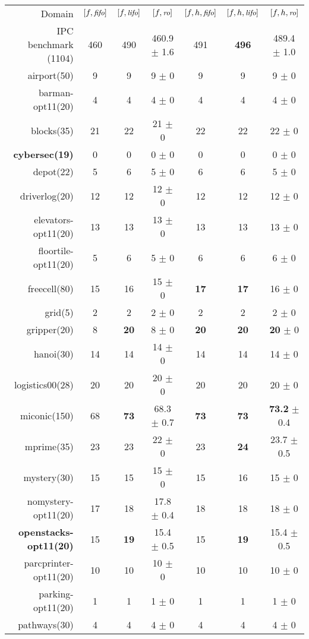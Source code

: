 \begin{center}
\begin{tabular}{|r|*{2}{ccc|}}
Domain & $[f,{\small\textit{fifo}}]$ & $[f,{\small\textit{lifo}}]$ & $[f,{\small\textit{ro}}]$ & $[f,h,{\small\textit{fifo}}]$ & $[f,h,{\small\textit{lifo}}]$ & $[f,h,{\small\textit{ro}}]$\\
IPC benchmark (1104) & 460 & 490 & 460.9 $\pm$ 1.6 & 491 & \textbf{496} & 489.4 $\pm$ 1.0\\
airport(50) & 9 & 9 & 9 $\pm$ 0 & 9 & 9 & 9 $\pm$ 0\\
barman-opt11(20) & 4 & 4 & 4 $\pm$ 0 & 4 & 4 & 4 $\pm$ 0\\
blocks(35) & 21 & 22 & 21 $\pm$ 0 & 22 & 22 & 22 $\pm$ 0\\
\textbf{cybersec(19)} & 0 & 0 & 0 $\pm$ 0 & 0 & 0 & 0 $\pm$ 0\\
depot(22) & 5 & 6 & 5 $\pm$ 0 & 6 & 6 & 5 $\pm$ 0\\
driverlog(20) & 12 & 12 & 12 $\pm$ 0 & 12 & 12 & 12 $\pm$ 0\\
elevators-opt11(20) & 13 & 13 & 13 $\pm$ 0 & 13 & 13 & 13 $\pm$ 0\\
floortile-opt11(20) & 5 & 6 & 5 $\pm$ 0 & 6 & 6 & 6 $\pm$ 0\\
freecell(80) & 15 & 16 & 15 $\pm$ 0 & \textbf{17} & \textbf{17} & 16 $\pm$ 0\\
grid(5) & 2 & 2 & 2 $\pm$ 0 & 2 & 2 & 2 $\pm$ 0\\
gripper(20) & 8 & \textbf{20} & 8 $\pm$ 0 & \textbf{20} & \textbf{20} & \textbf{20} $\pm$ 0\\
hanoi(30) & 14 & 14 & 14 $\pm$ 0 & 14 & 14 & 14 $\pm$ 0\\
logistics00(28) & 20 & 20 & 20 $\pm$ 0 & 20 & 20 & 20 $\pm$ 0\\
miconic(150) & 68 & \textbf{73} & 68.3 $\pm$ 0.7 & \textbf{73} & \textbf{73} & \textbf{73.2} $\pm$ 0.4\\
mprime(35) & 23 & 23 & 22 $\pm$ 0 & 23 & \textbf{24} & 23.7 $\pm$ 0.5\\
mystery(30) & 15 & 15 & 15 $\pm$ 0 & 15 & 16 & 15 $\pm$ 0\\
nomystery-opt11(20) & 17 & 18 & 17.8 $\pm$ 0.4 & 18 & 18 & 18 $\pm$ 0\\
\textbf{openstacks-opt11(20)} & 15 & \textbf{19} & 15.4 $\pm$ 0.5 & 15 & \textbf{19} & 15.4 $\pm$ 0.5\\
parcprinter-opt11(20) & 10 & 10 & 10 $\pm$ 0 & 10 & 10 & 10 $\pm$ 0\\
parking-opt11(20) & 1 & 1 & 1 $\pm$ 0 & 1 & 1 & 1 $\pm$ 0\\
pathways(30) & 4 & 4 & 4 $\pm$ 0 & 4 & 4 & 4 $\pm$ 0\\

\end{tabular}
\end{center}
